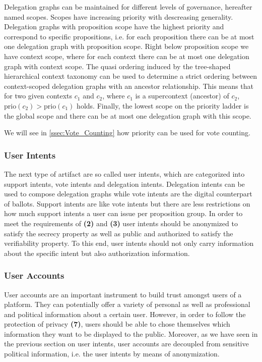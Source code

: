 Delegation graphs can be maintained for different levels of governance, hereafter named scopes.
Scopes have increasing priority with descreasing generality.
Delegation graphs with proposition scope have the highest priority and correspond to specific propositions, i.e. for each proposition there can be at most one delegation graph with proposition scope.
Right below proposition scope we have context scope, where for each context there can be at most one delegation graph with context scope.
The quasi ordering induced by the tree-shaped hierarchical context taxonomy can be used to determine a strict ordering between context-scoped delegation graphs with an ancestor relationship.
This means that for two given contexts $c_1$ and $c_2$, where $c_1$ is a supercontext (ancestor) of $c_2$, $\text{prio}(c_2)>\text{prio}(c_1)$ holds.
Finally, the lowest scope on the priority ladder is the global scope and there can be at most one delegation graph with this scope. 

We will see in \autoref{ssec:Vote_Counting} how priority can be used for vote counting.

\subsubsection{User Intents}
\label{ssec:User_Intents}
The next type of artifact are so called user intents, which are categorized into support intents, vote intents and delegation intents.
Delegation intents can be used to compose delegation graphs while vote intents are the digital counterpart of ballots.
Support intents are like vote intents but there are less restrictions on how much support intents a user can issue per proposition group.
In order to meet the requirements of \textbf{(2)} and \textbf{(3)} user intents should be anonymized to satisfy the secrecy property as well as public and authorized to satisfy the verifiability property.
To this end, user intents should not only carry information about the specific intent but also authorization information.

\subsubsection{User Accounts}
\label{ssec:User_Accounts}
User accounts are an important instrument to build trust amongst users of a  platform.
They can potentially offer a variety of personal as well as professional and political information about a certain user.
However, in order to follow the protection of privacy \textbf{(7)}, users should be able to chose themselves which information they want to be displayed to the public.
Moreover, as we have seen in the previous section on user intents, user accounts are decoupled from sensitive political information, i.e. the user intents by means of anonymization.

